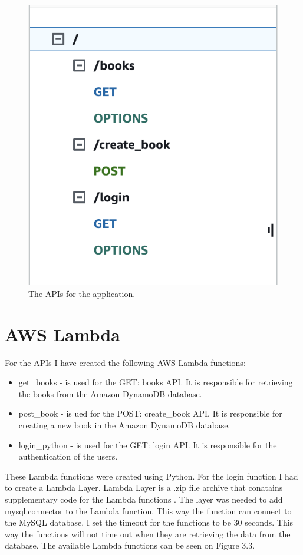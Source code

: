 \documentclass[11pt,a4paper,oneside]{report}
\begin{document}
\begin{figure}[!ht]
  \centering
  \includegraphics[scale=0.5]{api.png}
  \caption{The APIs for the application.}
  \label{fig:TexnicCenter}
\end{figure}

\section{AWS Lambda}

For the APIs I have created the following AWS Lambda functions:
\begin{itemize}
  \item get\_books - is used for the GET: books API. It is responsible for retrieving the books from the Amazon DynamoDB database.
  \item post\_book - is ued for the POST: create\_book API. It is responsible for creating a new book in the Amazon DynamoDB database.
  \item login\_python - is used for the GET: login API. It is responsible for the authentication of the users.
\end{itemize}

These Lambda functions were created using Python. For the login function I had to create a Lambda Layer. Lambda Layer is a .zip file archive that conatains supplementary code for the Lambda functions \cite{lambdalayer}.
The layer was needed to add mysql.connector to the Lambda function. This way the function can connect to the MySQL database. I set the timeout for the functions to be 30 seconds. This way the functions will not time out when they are retrieving the data from the database. The available Lambda functions can be seen on Figure 3.3.
\end{document}
